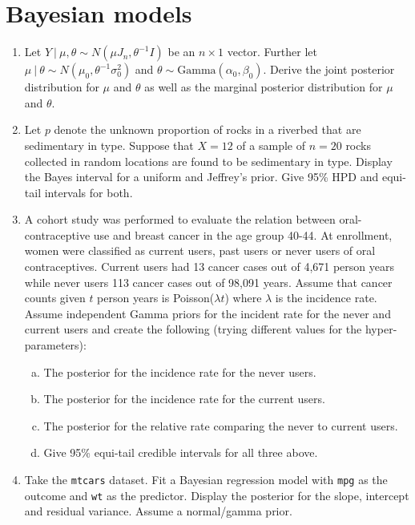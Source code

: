 \documentclass[12pt]{article}
\begin{document}
\section{Bayesian models}
\begin{enumerate}
\item Let $Y ~|~ \mu, \theta \sim N(\mu J_{n}, \theta^{-1} I)$ be an $n\times 1$ vector. Further
let $\mu ~|~ \theta \sim N(\mu_0 , \theta^{-1} \sigma^2_0)$ and $\theta \sim \mbox{Gamma}(\alpha_0, \beta_0)$.
Derive the joint posterior distribution for $\mu$ and $\theta$ as well as the marginal posterior distribution 
for $\mu$ and $\theta$.
\item Let $p$ denote the unknown proportion of rocks in a riverbed that are
sedimentary in type. Suppose that $X = 12$ of a sample of $n = 20$ rocks collected in
random locations are found to be sedimentary in type. Display the Bayes interval for 
a uniform and Jeffrey's prior. Give 95\% HPD and equi-tail intervals for both.
\item A cohort study was performed to evaluate the relation between oral-contraceptive
use and breast cancer in the age group 40-44. At enrollment, women were classified
as current users, past users or never users of oral contraceptives. Current users had 13 cancer
cases out of 4,671 person years while never users 113 cancer cases out of 98,091 years.
Assume that cancer counts given $t$ person years is Poisson($\lambda t$) where $\lambda$
is the incidence rate. Assume independent Gamma priors for the incident rate for the never
and current users and create the following (trying different values for the hyper-parameters):
\begin{enumerate}[a.]
\item The posterior for the incidence rate for the never users.
\item The posterior for the incidence rate for the current users.
\item The posterior for the relative rate comparing the never to current users.
\item Give 95\% equi-tail credible intervals for all three above.
\end{enumerate}
\item Take the \texttt{mtcars} dataset. Fit a Bayesian regression model with 
\texttt{mpg} as the outcome and \texttt{wt} as the predictor. Display the posterior
for the slope, intercept and residual variance. Assume a normal/gamma prior.
\end{enumerate}
\end{document}
